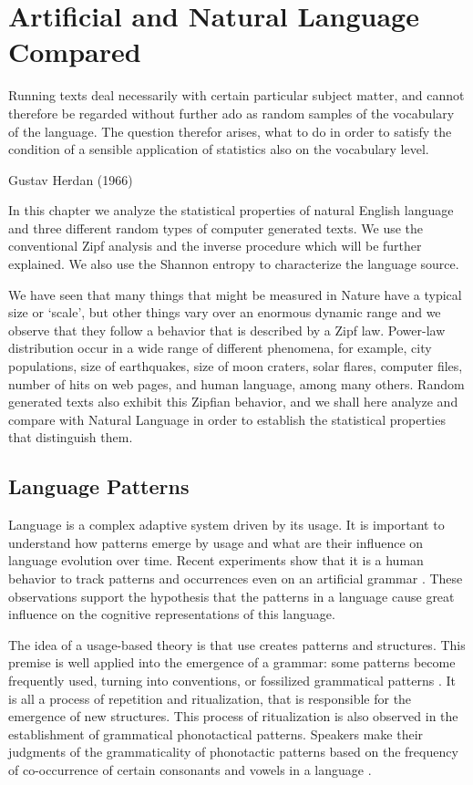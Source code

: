 \chapter{Artificial and Natural Language Compared}
\epigraph{Running texts deal necessarily with certain particular subject matter,
and cannot therefore be regarded without further ado as random samples of the
vocabulary of the language. The question therefor arises, what to do in order to
satisfy the condition of a sensible application of statistics also on the vocabulary level.}{Gustav Herdan (1966)}


In this chapter we analyze the statistical properties of natural English language
and three different random types of computer generated texts.
We use the conventional Zipf analysis and the inverse procedure which will be
further explained. We also use the Shannon entropy to characterize the language source.

We have seen that many things that might be measured in Nature have a typical
size or `scale', but other things vary over an enormous dynamic range and
we observe that they follow a behavior that is described by a Zipf law.
Power-law distribution occur in a wide range of different phenomena, for example,
city populations, size of earthquakes, size of moon craters, solar flares,
computer files, number of hits on web pages, and human language, among many
others. Random generated texts also exhibit this Zipfian behavior, and we
shall here analyze and compare with Natural Language in order to establish 
the statistical properties that distinguish them.



\section{Language Patterns}
Language is a complex adaptive system driven by its usage. It is important to understand
how patterns emerge by usage and what are their influence on language evolution over time.
Recent experiments show that it is a human behavior to track patterns and occurrences even on
an artificial grammar \citep{Saffran1996,Saffran1999,Saffran2003}. These observations
support the hypothesis that the patterns in a language cause great influence on the 
cognitive representations of this language.

The idea of a usage-based theory is that use creates patterns and structures. 
This premise is well applied into the emergence of a grammar: 
some patterns become frequently used, turning into conventions,
or fossilized grammatical patterns \citep{givon1979,hopper1980,hopper1984}. 
It is all a process of repetition and ritualization,
that is responsible for the emergence of new structures.
This process of ritualization is also observed in the establishment of grammatical phonotactical patterns.
Speakers make their judgments of the grammaticality of phonotactic patterns based on the frequency of 
co-occurrence of certain consonants and vowels in a language \citep{frisch1996,pierrehumbert1994}. 


